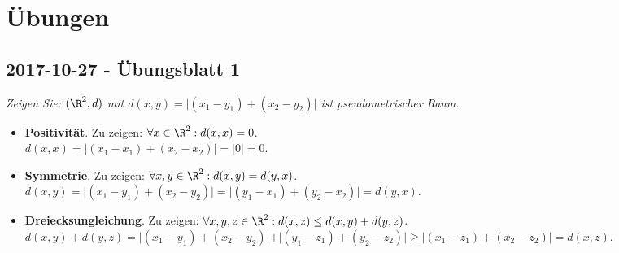 \chapter{Übungen}
\section{2017-10-27 - Übungsblatt 1}
\begin{problem*}[1]
  \emph{Zeigen Sie: $ (\R^2, d) $ mit $ d(x,y) = \vert (x_1-y_1)+(x_2-y_2) \vert $ ist pseudometrischer Raum.}
  \begin{itemize}
    \item \textbf{Positivität}. Zu zeigen: $ \forall x \in \R^2: d(x,x) = 0 $. \\
      $ d(x,x) = \vert (x_1-x_1)+(x_2-x_2) \vert = \vert 0 \vert = 0 $.
    \item \textbf{Symmetrie}. Zu zeigen: $ \forall x, y \in \R^2: d(x,y) = d(y,x) $. \\
      $ d(x,y) = \vert (x_1-y_1)+(x_2-y_2) \vert = \vert (y_1-x_1)+(y_2-x_2) \vert = d(y,x) $.
    \item \textbf{Dreiecksungleichung}. Zu zeigen: $ \forall x,y,z \in \R^2: d(x,z) \leq d(x,y) + d(y,z) $. \\
      $ d(x,y) + d(y,z) = \vert (x_1-y_1)+(x_2-y_2) \vert + \vert (y_1-z_1)+(y_2-z_2) \vert \geq \vert (x_1-z_1) + (x_2 - z_2) \vert = d(x,z) $.
  \end{itemize}
\end{problem*}

